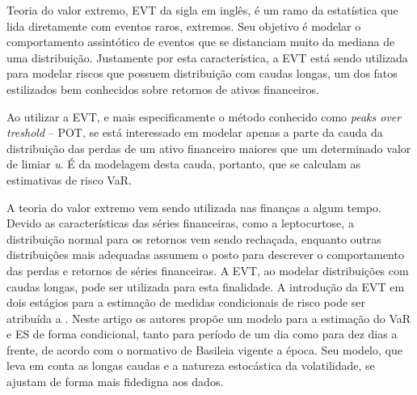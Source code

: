 \documentclass[review]{elsarticle}
\theoremstyle{definition}
\begin{document}


Teoria do valor extremo, EVT da sigla em inglês, é um ramo da estatística que lida diretamente com eventos raros, extremos. Seu objetivo é modelar o comportamento assintótico de eventos que se distanciam muito da mediana de uma distribuição. Justamente por esta característica, a EVT está sendo utilizada para modelar riscos que possuem distribuição com caudas longas, um dos fatos estilizados bem conhecidos sobre retornos de ativos financeiros.

Ao utilizar a EVT, e mais especificamente o método conhecido como \emph{peaks over treshold} – POT, se está interessado em modelar apenas a parte da cauda da distribuição das perdas de um ativo financeiro maiores que um determinado valor de limiar \emph{u}. É da modelagem desta cauda, portanto, que se calculam as estimativas de risco VaR.

A teoria do valor extremo vem sendo utilizada nas finanças a algum tempo. Devido as características das séries financeiras, como a leptocurtose, a distribuição normal para os retornos vem sendo rechaçada, enquanto outras distribuições mais adequadas assumem o posto para descrever o comportamento das perdas e retornos de séries financeiras. A EVT, ao modelar distribuições com caudas longas, pode ser utilizada para esta finalidade. A introdução da EVT em dois estágios para a estimação de medidas condicionais de risco pode ser atribuída a \cite{McNeil2000}. Neste artigo os autores propõe um modelo para a estimação do VaR e ES de forma condicional, tanto para período de um dia como para dez dias a frente, de acordo com o normativo de Basileia vigente a época. Seu modelo, que leva em conta as longas caudas e a natureza estocástica da volatilidade, se ajustam de forma mais fidedigna aos dados.
\end{document}
